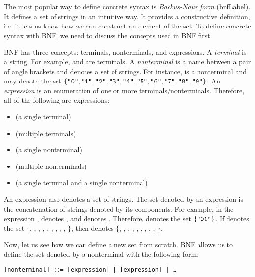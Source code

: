 The most popular way to define concrete syntax is \textit{Backus-Naur
form} (\acrshort{bnfLabel}). It defines a set of strings
in an intuitive way. It provides a constructive definition, i.e. it lets us know
how we can construct an element of the set. To define concrete syntax with BNF,
we need to discuss the concepts used in BNF first.

BNF has three concepts: terminals, nonterminals, and expressions. A
\textit{terminal} is a string. For example,  and
 are terminals. A \textit{nonterminal} is a name
between a pair of angle brackets and denotes a set of strings. For instance,
 is a nonterminal and may denote the set
$\{\texttt{"0"},\texttt{"1"},\texttt{"2"},\texttt{"3"},\texttt{"4"},\texttt{"5"},\texttt{"6"},\texttt{"7"},\texttt{"8"},\texttt{"9"}\}$.
An \textit{expression} is an enumeration of one or more
terminals/nonterminals. Therefore, all of the following are expressions:

\begin{itemize}
  \item {} (a single terminal)
  \item {}  (multiple terminals)
  \item {} (a single nonterminal)
  \item {}  (multiple nonterminals)
  \item {}  (a single terminal and a single nonterminal)
\end{itemize}

An expression also denotes a set of strings. The set denoted by an expression is
the concatenation of strings denoted by its components. For example, in the
expression  ,  denotes , and 
denotes . Therefore,   denotes the set $\{
  \texttt{"01"} \}$. If  denotes the set
$\{$, , , , , ,
, , , $\}$,
then   denotes
$\{$, , , , , , , , , $\}$.

Now, let us see how we can define a new set from scratch. BNF allows us to define
the set denoted by a nonterminal with the following form:

\begin{verbatim}
[nonterminal] ::= [expression] | [expression] | …
\end{verbatim}


